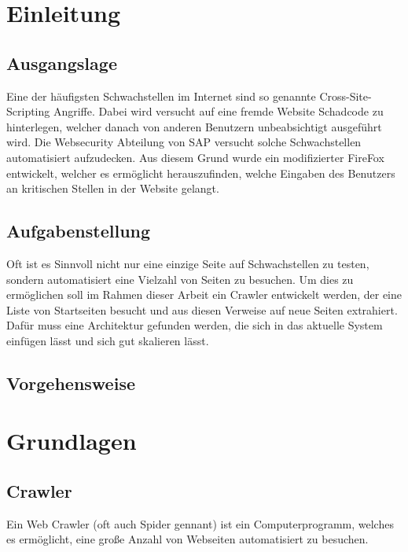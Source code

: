 \chapter{Einleitung}
\section{Ausgangslage}
Eine der häufigsten Schwachstellen im Internet sind so genannte Cross-Site-Scripting Angriffe. Dabei wird versucht auf eine fremde Website Schadcode zu hinterlegen, welcher danach von anderen Benutzern unbeabsichtigt ausgeführt wird. 
Die Websecurity Abteilung von SAP versucht solche Schwachstellen automatisiert aufzudecken. Aus diesem Grund wurde ein modifizierter FireFox entwickelt, welcher es ermöglicht herauszufinden, welche Eingaben des Benutzers an kritischen Stellen in der Website gelangt.
\section{Aufgabenstellung}
Oft ist es Sinnvoll nicht nur eine einzige Seite auf Schwachstellen zu testen, sondern automatisiert eine Vielzahl von Seiten zu besuchen. Um dies zu ermöglichen soll im Rahmen dieser Arbeit ein Crawler entwickelt werden, der eine Liste von Startseiten besucht und aus diesen Verweise auf neue Seiten extrahiert. 
Dafür muss eine Architektur gefunden werden, die sich in das aktuelle System einfügen lässt und sich gut skalieren lässt.
\section{Vorgehensweise}

\chapter{Grundlagen}
\section{Crawler}
Ein Web Crawler (oft auch Spider gennant) ist ein Computerprogramm, welches es ermöglicht, eine große Anzahl von Webseiten automatisiert zu besuchen.
